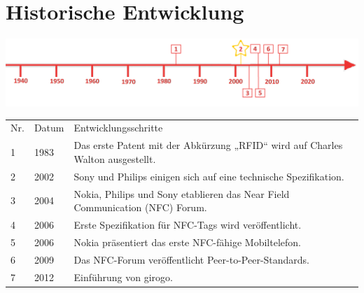 \section*{Historische Entwicklung}
\includegraphics[width=\textwidth]{Kapitel/NFC/Grafiken/Zeitstrahl2}
\par
\noindent
\begin{tabular}{p{0.5 cm}p{1.5 cm}p{15.55 cm}}
\rowcolors{2}{}{\topicolor!20}
	Nr. & Datum & Entwicklungsschritte~\cite{nfc.1}\\
	1 & 1983 & Das erste Patent mit der Abkürzung „RFID“ wird auf Charles Walton ausgestellt.\\
	2 & 2002 & Sony und Philips einigen sich auf eine technische Spezifikation.\\
	3 & 2004 & Nokia, Philips und Sony etablieren das Near Field Communication (NFC) Forum.\\
	4 & 2006 & Erste Spezifikation für NFC-Tags wird veröffentlicht.\\
	5 & 2006 & Nokia präsentiert das erste NFC-fähige Mobiltelefon.\\
	6 & 2009 & Das NFC-Forum veröffentlicht Peer-to-Peer-Standards.\\
	7 & 2012 & Einführung von girogo.\\
\end{tabular}
\par
